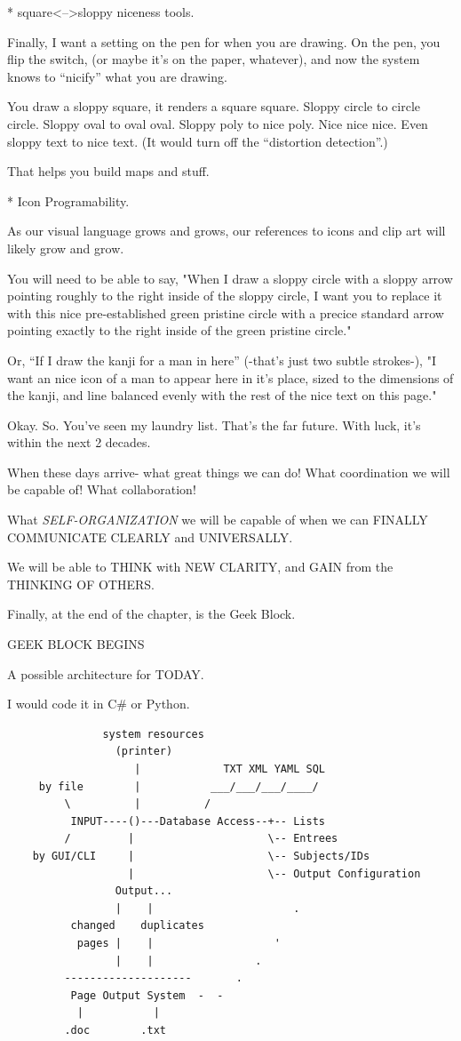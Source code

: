 \documentclass[oneside]{book}
\begin{document}
* square<-->sloppy niceness tools.

Finally, I want a setting on the pen for when you are drawing. On the
pen, you flip the switch, (or maybe it's on the paper, whatever), and
now the system knows to ``nicify'' what you are drawing.

You draw a sloppy square, it renders a square square. Sloppy circle to
circle circle. Sloppy oval to oval oval. Sloppy poly to nice
poly. Nice nice nice. Even sloppy text to nice text. (It would turn
off the ``distortion detection''.)

That helps you build maps and stuff.

* Icon Programability.

As our visual language grows and grows, our references to icons and
clip art will likely grow and grow.

You will need to be able to say, "When I draw a sloppy circle with a
sloppy arrow pointing roughly to the right inside of the sloppy
circle, I want you to replace it with this nice pre-established green
pristine circle with a precice standard arrow pointing exactly to the
right inside of the green pristine circle."

Or, ``If I draw the kanji for a man in here'' (-that's just two subtle
strokes-), "I want an nice icon of a man to appear here in it's place,
sized to the dimensions of the kanji, and line balanced evenly with
the rest of the nice text on this page."

Okay. So.
You've seen my laundry list.
That's the far future. With luck, it's within the next 2 decades.

When these days arrive- what great things we can do! What coordination
we will be capable of! What collaboration!

What \emph{SELF-ORGANIZATION} we will be capable of when we can FINALLY
COMMUNICATE CLEARLY and UNIVERSALLY.

We will be able to THINK with NEW CLARITY, and GAIN from the THINKING
OF OTHERS.

Finally, at the end of the chapter, is the Geek Block.

GEEK BLOCK BEGINS

A possible architecture for TODAY.

I would code it in C\# or Python.

\begin{verbatim}
               system resources
                 (printer)
                    |             TXT XML YAML SQL
     by file        |           ___/___/___/____/
         \          |          /
          INPUT----()---Database Access--+-- Lists
         /         |                     \-- Entrees
    by GUI/CLI     |                     \-- Subjects/IDs
                   |                     \-- Output Configuration
                 Output...
                 |    |                      .
          changed    duplicates
           pages |    |                   '
                 |    |                .
         --------------------       .
          Page Output System  -  -
           |           |
         .doc        .txt
\end{verbatim}
\end{document}
